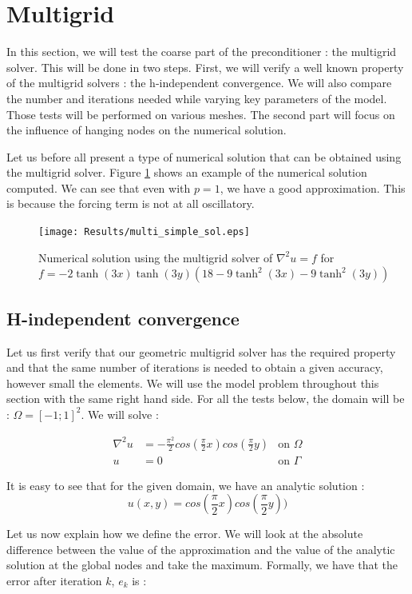 \section{Multigrid}
In this section, we will test the coarse part of the preconditioner : the multigrid solver. This will be done in two steps. First, we will verify a well known property of the multigrid solvers : the h-independent convergence. We will also compare the number and iterations needed while varying key parameters of the model. Those tests will be performed on various meshes. The second part will focus on the influence of hanging nodes on the numerical solution. 

Let us before all present a type of numerical solution that can be obtained using the multigrid solver. Figure \ref{multi_simple_sol} shows an example of the numerical solution computed. We can see that even with $p=1$, we have a good approximation. This is because the forcing term is not at all oscillatory.

\begin{figure}
\centering
\texttt{[image: Results/multi\_simple\_sol.eps]}
\caption{Numerical solution using the multigrid solver of $\nabla^2 u = f$ for $f = -2\tanh(3x)\tanh(3y)(18-9\tanh^2(3x)-9\tanh^2(3y))$}
\label{multi_simple_sol}
\end{figure}

\subsection{H-independent convergence}
Let us first verify that our geometric multigrid solver has the required property and that the same number of iterations is needed to obtain a given accuracy, however small the elements. We will use the model problem throughout this section with the same right hand side. For all the tests below, the domain  will be : $\Omega = [-1;1]^2$. We will solve : 

\begin{align}
\nabla^2 u &= -\frac{\pi^2}{2}cos(\frac{\pi}{2}x)cos(\frac{\pi}{2}y) &\text{on $\Omega$} \\
u &= 0  &\text{on $\Gamma$}
\end{align}

It is easy to see that for the given domain, we have an analytic solution : 
$$u(x,y) = cos(\frac{\pi}{2}x)cos(\frac{\pi}{2}y))$$ 


Let us now explain how we define the error. We will look at the absolute difference between the value of the approximation and the value of the analytic solution at the global nodes and take the maximum. Formally, we have that the error after iteration $k$, $e_k$ is :

